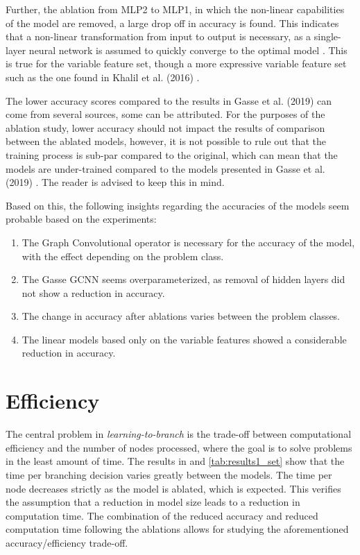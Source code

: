 Further, the ablation from MLP2 to MLP1, in which the non-linear capabilities of the model are removed, a large drop off in accuracy is found. This indicates that a non-linear transformation from input to output is necessary, as a single-layer neural network is assumed to quickly converge to the optimal model \cite{goodfellow2016deep}. This is true for the variable feature set, though a more expressive variable feature set such as the one found in Khalil et al. (2016) \cite{khalil2016learning}.



The lower accuracy scores compared to the results in Gasse et al. (2019) \cite{gasse2019exact} can come from several sources, some can be attributed. For the purposes of the ablation study, lower accuracy should not impact the results of comparison between the ablated models, however, it is not possible to rule out that the training process is sub-par compared to the original, which can mean that the models are under-trained compared to the models presented in Gasse et al. (2019) \cite{gasse2019exact}. The reader is advised to keep this in mind. 



Based on this, the following insights regarding the accuracies of the models seem probable based on the experiments:
\begin{enumerate}[label=(\roman*)]
    \item The Graph Convolutional operator is necessary for the accuracy of the model, with the effect depending on the problem class.
    \item The Gasse GCNN seems overparameterized, as removal of hidden layers did not show a reduction in accuracy.
    \item The change in accuracy after ablations varies between the problem classes.
    \item The linear models based only on the variable features showed a considerable reduction in accuracy.
\end{enumerate}


\section{Efficiency}\label{sec:disc_efficiency}



The central problem in \textit{learning-to-branch} is the trade-off between computational efficiency and the number of nodes processed, where the goal is to solve problems in the least amount of time. The results in  and \cref{tab:results1_set} show that the time per branching decision varies greatly between the models. The time per node decreases strictly as the model is ablated, which is expected. This verifies the assumption that a reduction in model size leads to a reduction in computation time. The combination of the reduced accuracy and reduced computation time following the ablations allows for studying the aforementioned accuracy/efficiency trade-off. 

